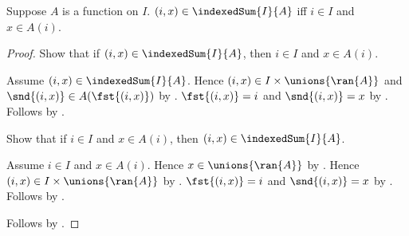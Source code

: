 \begin{proposition}\label{indexed_sum_iff}
    Suppose $A$ is a function on $I$.
    $(i,x)\in\indexedSum{I}{A}$ iff $i\in I$ and $x\in A(i)$.
\end{proposition}
\begin{proof}
    Show that if $(i,x)\in\indexedSum{I}{A}$, then
        $i\in I$ and $x\in A(i)$.
    \begin{subproof}
        Assume $(i,x)\in\indexedSum{I}{A}$.
        Hence $(i,x)\in I\times\unions{\ran{A}}$ and
            $\snd{(i,x)}\in A(\fst{(i,x)})$ by .
        $\fst{(i,x)}=i$ and $\snd{(i,x)}=x$ by .
        Follows by .
    \end{subproof}
    Show that if $i\in I$ and $x\in A(i)$, then
        $(i,x)\in\indexedSum{I}{A}$.
    \begin{subproof}
        Assume $i\in I$ and $x\in A(i)$.
        Hence $x\in\unions{\ran{A}}$
            by .
        Hence $(i,x)\in I\times\unions{\ran{A}}$
            by .
        $\fst{(i,x)}=i$ and $\snd{(i,x)}=x$ by .
        Follows by .
    \end{subproof}
    Follows by \auto.
\end{proof}

